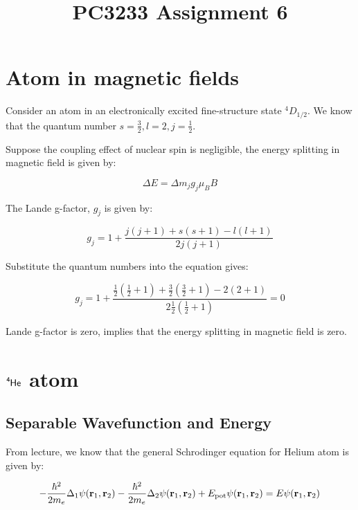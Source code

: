 \documentclass[11pt]{article}
\title{PC3233 Assignment 6}
\begin{document}
    
    \maketitle
    
    \section{Atom in magnetic fields}

    Consider an atom in an electronically excited fine-structure state \texorpdfstring{${}^{4}D_{1/2}$}{4D1/2}. We
    know that the quantum number $s = \frac{3}{2}, l = 2, j = \frac{1}{2}$.

    Suppose the coupling effect of nuclear spin is negligible, the energy splitting in magnetic field is given by:

    \begin{equation}
      \Delta E = \Delta m_j g_j \mu_B B
    \end{equation}

    The Lande g-factor, $g_j$ is given by:

    \begin{equation}
      g_j = 1 + \frac{j(j+1) + s(s+1) - l(l+1)}{2j(j+1)}
    \end{equation}

    Substitute the quantum numbers into the equation gives:

    \begin{equation}
      g_j = 1 + \frac{\frac{1}{2}(\frac{1}{2}+1) + \frac{3}{2}(\frac{3}{2}+1) - 2(2+1)}{2\frac{1}{2}(\frac{1}{2}+1)} = 0
    \end{equation}

    Lande g-factor is zero, implies that the energy splitting in magnetic field is zero.

    \section{$\ce{^{4}He}$ atom}

    \subsection{Separable Wavefunction and Energy}

    From lecture, we know that the general Schrodinger equation for Helium atom is given by:

    \begin{equation}
      - \frac{\hbar^{2}}{2m_e}\Delta_1 \psi(\vb{r}_{1}, \vb{r}_{2}) 
      - \frac{\hbar^{2}}{2m_e}\Delta_2 \psi(\vb{r}_{1}, \vb{r}_{2})
      + E_{\text{pot}}\psi(\vb{r}_{1}, \vb{r}_{2}) = E\psi(\vb{r}_{1}, \vb{r}_{2})
    \end{equation}
\end{document}
